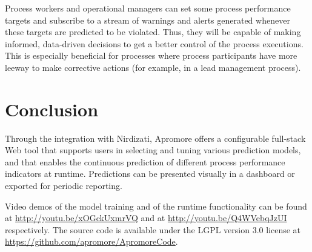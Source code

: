 \documentclass[runningheads,a4paper]{llncs}
\begin{document}
Process workers and operational managers can set some process performance targets and subscribe to a stream of warnings and alerts generated whenever these targets are predicted to be violated. Thus, they will be capable of making informed, data-driven decisions to get a better control of the process executions. This is especially beneficial for processes where process participants have more leeway to make corrective actions (for example, in a lead management process).

\section{Conclusion} \label{sec:conclusion}
Through the integration with Nirdizati, Apromore offers a configurable full-stack Web tool that supports users in selecting and tuning various prediction models, and that enables the continuous prediction of different process performance indicators at runtime. Predictions can be presented visually in a dashboard or exported for periodic reporting.

Video demos of the model training and of the runtime functionality can be found at \url{http://youtu.be/xOGckUxmrVQ} and at \url{http://youtu.be/Q4WVebqJzUI} respectively. The source code is available under the LGPL version 3.0 license at \url{https://github.com/apromore/ApromoreCode}.


\end{document}

